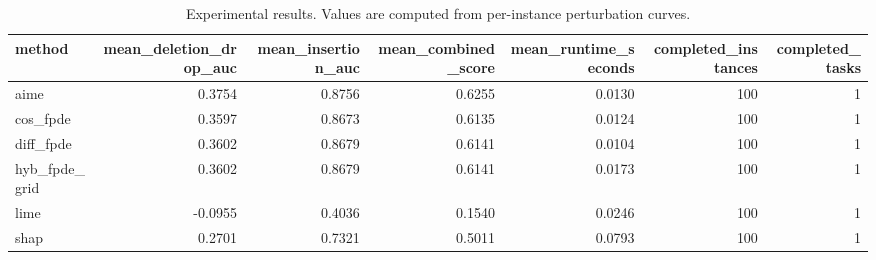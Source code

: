 \begin{table}[t]
\caption{Experimental results. Values are computed from per-instance perturbation curves.}
\label{tab:main_results_computed}
\centering
\begin{tabular}{lrrrrrr}
\toprule
method & mean\_deletion\_drop\_auc & mean\_insertion\_auc & mean\_combined\_score & mean\_runtime\_seconds & completed\_instances & completed\_tasks \\
\midrule
aime & 0.3754 & 0.8756 & 0.6255 & 0.0130 & 100 & 1 \\
cos\_fpde & 0.3597 & 0.8673 & 0.6135 & 0.0124 & 100 & 1 \\
diff\_fpde & 0.3602 & 0.8679 & 0.6141 & 0.0104 & 100 & 1 \\
hyb\_fpde\_grid & 0.3602 & 0.8679 & 0.6141 & 0.0173 & 100 & 1 \\
lime & -0.0955 & 0.4036 & 0.1540 & 0.0246 & 100 & 1 \\
shap & 0.2701 & 0.7321 & 0.5011 & 0.0793 & 100 & 1 \\
\bottomrule
\end{tabular}

\end{table}
